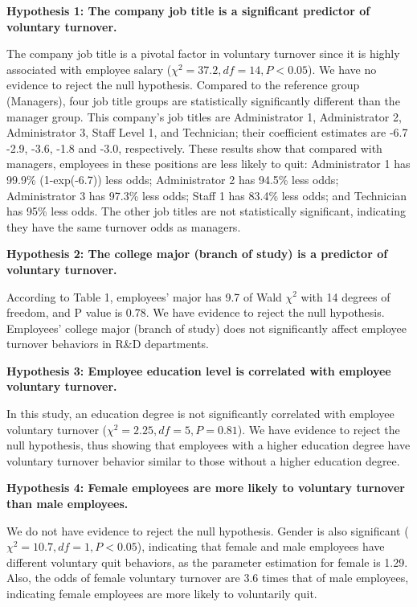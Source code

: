 \textbf{Hypothesis 1: The company job title is a significant predictor of voluntary turnover.}

The company job title is a pivotal factor in voluntary turnover since it is highly associated with employee salary ($\chi^2=37.2, df=14, P<0.05$). We have no evidence to reject the null hypothesis. Compared to the reference group (Managers), four job title groups are statistically significantly different than the manager group. This company's job titles are Administrator 1, Administrator 2, Administrator 3, Staff Level 1, and Technician; their coefficient estimates are -6.7 -2.9, -3.6, -1.8 and -3.0, respectively. These results show that compared with managers, employees in these positions are less likely to quit: Administrator 1 has 99.9\% (1-exp(-6.7)) less odds; Administrator 2 has 94.5\% less odds; Administrator 3 has 97.3\% less odds; Staff 1 has 83.4\% less odds; and Technician has 95\% less odds. The other job titles are not statistically significant, indicating they have the same turnover odds as managers.

\textbf{Hypothesis 2: The college major (branch of study) is a predictor of voluntary turnover. }

According to Table 1, employees' major has 9.7 of Wald $\chi^2$ with 14 degrees of freedom, and P value is 0.78. We have evidence to reject the null hypothesis. Employees' college major (branch of study) does not significantly affect employee turnover behaviors in R\&D departments. 

\textbf{Hypothesis 3: Employee education level is correlated with employee voluntary turnover.}

In this study, an education degree is not significantly correlated with employee voluntary turnover ($\chi^2=2.25, df=5, P=0.81$). We have evidence to reject the null hypothesis, thus showing that employees with a higher education degree have voluntary turnover behavior similar to those without a higher education degree. 

\textbf{Hypothesis 4: Female employees are more likely to voluntary turnover than male employees. }

We do not have evidence to reject the null hypothesis. Gender is also significant ($\chi^2=10.7, df=1, P<0.05$), indicating that female and male employees have different voluntary quit behaviors, as the parameter estimation for female is 1.29. Also, the odds of female voluntary turnover are 3.6 times that of male employees, indicating female employees are more likely to voluntarily quit. 

